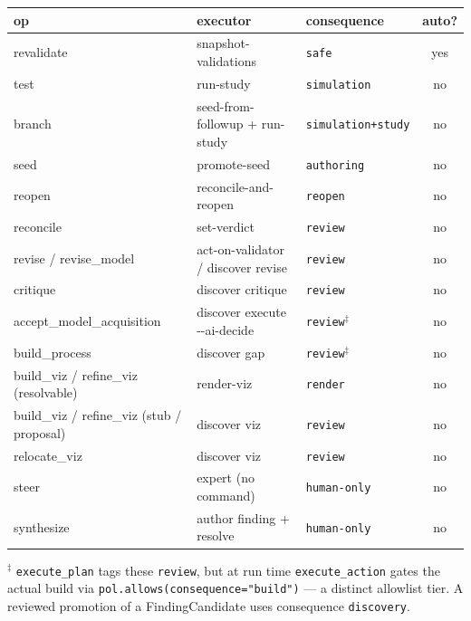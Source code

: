 \documentclass[11pt]{article}
\newcommand{\code}[1]{\texttt{\small #1}}
\begin{document}
\begin{center}\small
\begin{tabularx}{\textwidth}{@{}llY c@{}}
\toprule
\textbf{op} & \textbf{executor} & \textbf{consequence} & \textbf{auto?}\\
\midrule
revalidate   & snapshot-validations        & \code{safe}            & \textcolor{good}{yes}\\
test         & run-study                   & \code{simulation}      & no\\
branch       & seed-from-followup + run-study & \code{simulation+study} & no\\
seed         & promote-seed                & \code{authoring}       & no\\
reopen       & reconcile-and-reopen        & \code{reopen}          & no\\
reconcile    & set-verdict                 & \code{review}          & no\\
revise / revise\_model & act-on-validator / discover revise & \code{review} & no\\
critique     & discover critique           & \code{review}          & no\\
accept\_model\_acquisition & discover execute -{}-ai-decide & \code{review}$^\ddagger$ & no\\
build\_process & discover gap              & \code{review}$^\ddagger$ & no\\
build\_viz / refine\_viz (resolvable) & render-viz & \code{render}   & no\\
build\_viz / refine\_viz (stub / proposal) & discover viz & \code{review} & no\\
relocate\_viz & discover viz               & \code{review}          & no\\
steer        & expert (no command)         & \code{human-only}      & no\\
synthesize   & author finding + resolve    & \code{human-only}      & no\\
\bottomrule
\end{tabularx}
\end{center}
{\footnotesize $^\ddagger$ \code{execute\_plan} tags these \code{review}, but at run time
\code{execute\_action} gates the actual build via \code{pol.allows(consequence="build")} --- a
distinct allowlist tier. A reviewed promotion of a FindingCandidate uses consequence
\code{discovery}.}
\end{document}
